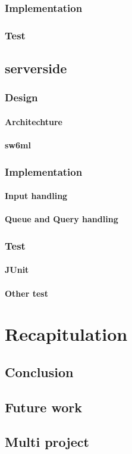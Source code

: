      \subsection{Implementation}
     \subsection{Test}

  \section{serverside} %
    \subsection{Design}
      \subsubsection{Architechture} %
      \subsubsection{sw6ml} %
    \subsection{Implementation}
      \subsubsection{Input handling}
      \subsubsection{Queue and Query handling} %
    \subsection{Test}
      \subsubsection{JUnit}
      \subsubsection{Other test}

\chapter{Recapitulation}
  \section{Conclusion}
  \section{Future work}
  \section{Multi project} %



\appendix


